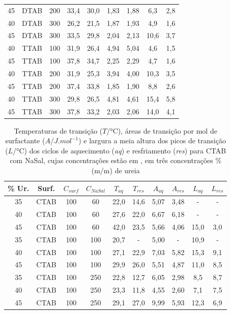\begin{table}[H]
{\begin{tabular}{ccccccccc}
    			45 & DTAB & 200 & 33,4 & 30,0 & 1,83 & 1,88 & 6,3 &	2,8\\
    			40 & DTAB & 300 & 26,2 & 21,5 & 1,87 & 1,93 & 4,9 &	1,6\\
    			45 & DTAB & 300 & 33,5 & 29,8 & 2,04 & 2,13 & 10,6 & 3,7\\
    			\midrule
    			40 & TTAB & 100 & 31,9 & 26,4 & 4,94 & 5,04 & 4,6 &	1,5\\
    			45 & TTAB & 100 & 37,8 & 34,7 & 2,25 & 2,29 & 4,7 &	1,6\\
    			40 & TTAB & 200 & 31,9 & 25,3 & 3,94 & 4,00 & 10,3 & 3,5\\
    			45 & TTAB & 200 & 37,4 & 33,8 & 1,85 & 1,90 & 8,8 &	2,6\\
    			40 & TTAB & 300 & 29,8 & 26,5 & 4,81 & 4,61 & 15,4 & 5,8\\
    			45 & TTAB & 300 & 37,8 & 33,2 & 2,03 & 2,06 & 14,0 & 4,1\\
                \bottomrule
                \end{tabular}}%
            {}
        \end{table}
        
      \begin{table}[H]
          \IBGEtab%
          {\caption{Temperaturas de transição ($T$/°C), áreas de transição por mol de surfactante ($A$/$J.mol^{-1}$) e largura a meia altura dos picos de transição ($L$/°C) dos ciclos de aquecimento (\emph{aq}) e resfriamento (\emph{res}) para CTAB com NaSal, cujas concentrações estão em \mM, em três concentrações \% (m/m) de ureia}
          \label{tab:DSC_temp_areas_NaSal}}%
            {\begin{tabular}{cccccccccc}
                \toprule
                \% Ur. & Surf. & $C_{surf}$ & $C_{NaSal}$ &
                $T_{aq}$ & $T_{res}$ & $A_{aq}$ & $A_{res}$ & $L_{aq}$ & $L_{res}$\\
       			\midrule
       			35 & CTAB & 100 & 60 & 22,0 & 14,6 & 5,07 & 3,48 & - & -\\
       			40 & CTAB & 100 & 60 & 27,6 & 22,0 & 6,67 & 6,18 & - & -\\
       			45 & CTAB & 100 & 60 & 42,0 & 23,5 & 5,66 & 4,06 & 15,0 & 3,0\\
       			35 & CTAB & 100 & 100 & 20,7 & - & 5,00 & - & 10,9 & -\\
       			40 & CTAB & 100 & 100 & 27,1 & 22,9 & 7,03 & 5,82 & 15,3 &	9,1\\
       			45 & CTAB & 100 & 100 & 29,9 & 26,0 & 5,51 & 4,87 & 11,0 &	8,5\\
       			35 & CTAB & 100 & 250 & 22,8 & 12,7 & 6,05 & 2,98 & 8,5 &	8,7\\
       			40 & CTAB & 100 & 250 & 23,3 & 11,8 & 4,55 & 2,60 & 7,1 &	7,5\\
       			45 & CTAB & 100 & 250 & 29,1 & 27,0 & 9,99 & 5,93 & 12,3 &	6,9\\
       			\bottomrule
            \end{tabular}}%
                {}
            \end{table}

